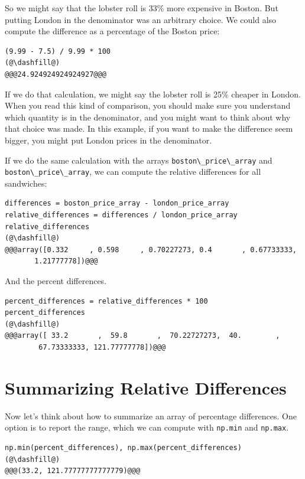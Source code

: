 So we might say that the lobster roll is 33\% more expensive in Boston.
But putting London in the denominator was an arbitrary choice. We could
also compute the difference as a percentage of the Boston price:

\begin{lstlisting}[]
(9.99 - 7.5) / 9.99 * 100
(@\dashfill@)
@@@24.924924924924927@@@
\end{lstlisting}

If we do that calculation, we might say the lobster roll is 25\% cheaper
in London. When you read this kind of comparison, you should make sure
you understand which quantity is in the denominator, and you might want
to think about why that choice was made. In this example, if you want to
make the difference seem bigger, you might put London prices in the
denominator.

If we do the same calculation with the arrays
\passthrough{\lstinline!boston\_price\_array!} and
\passthrough{\lstinline!boston\_price\_array!}, we can compute the
relative differences for all sandwiches:

\begin{lstlisting}[]
differences = boston_price_array - london_price_array
relative_differences = differences / london_price_array
relative_differences
(@\dashfill@)
@@@array([0.332     , 0.598     , 0.70227273, 0.4       , 0.67733333,
       1.21777778])@@@
\end{lstlisting}

And the percent differences.

\begin{lstlisting}[]
percent_differences = relative_differences * 100
percent_differences
(@\dashfill@)
@@@array([ 33.2       ,  59.8       ,  70.22727273,  40.        ,
        67.73333333, 121.77777778])@@@
\end{lstlisting}

\hypertarget{summarizing-relative-differences}{%
\section{Summarizing Relative
Differences}\label{summarizing-relative-differences}}

Now let's think about how to summarize an array of percentage
differences. One option is to report the range, which we can compute
with \passthrough{\lstinline!np.min!} and
\passthrough{\lstinline!np.max!}.

\begin{lstlisting}[]
np.min(percent_differences), np.max(percent_differences)
(@\dashfill@)
@@@(33.2, 121.77777777777779)@@@
\end{lstlisting}

